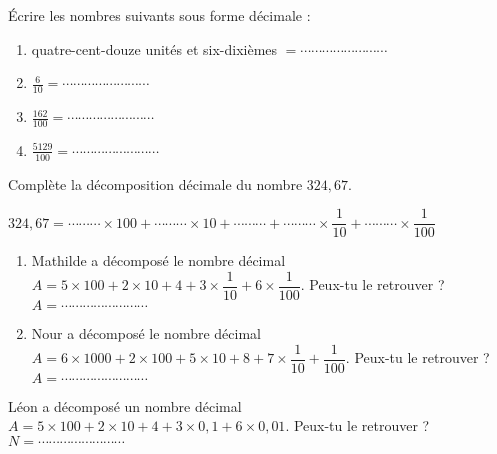 \begin{minipage}{0.5\linewidth}


Écrire les nombres suivants sous forme décimale :
\begin{enumerate}
\item quatre-cent-douze unités et six-dixièmes $= \cdots\cdots\cdots\cdots\cdots\cdots\cdots\cdots $
\item $\frac{6}{10}= \cdots\cdots\cdots\cdots\cdots\cdots\cdots\cdots$
\item $\frac{162}{100}= \cdots\cdots\cdots\cdots\cdots\cdots\cdots\cdots$
\item $\frac{5129}{100}= \cdots\cdots\cdots\cdots\cdots\cdots\cdots\cdots$
\end{enumerate}
 

Complète la décomposition décimale du nombre $324,67$.

$324,67 = \cdots\cdots\cdots  \times 100 + \cdots\cdots\cdots \times 10 + \cdots\cdots\cdots  + \cdots\cdots\cdots \times \dfrac{1}{10} + \cdots\cdots\cdots \times \dfrac{1}{100} $




\begin{enumerate}


\item Mathilde a décomposé le nombre décimal  $A = 5\times 100 + 2\times 10 + 4 + 3\times \dfrac{1}{10} +  6\times \dfrac{1}{100} $. Peux-tu le retrouver ?
$A = \cdots\cdots\cdots\cdots\cdots\cdots\cdots\cdots $

\item Nour a décomposé le nombre décimal  $A = 6\times 1000 + 2\times 100 + 5\times 10 + 8 + 7\times \dfrac{1}{10} +   \dfrac{1}{100} $. Peux-tu le retrouver ?
$A = \cdots\cdots\cdots\cdots\cdots\cdots\cdots\cdots $
\end{enumerate}



Léon a décomposé un nombre décimal  $A = 5\times 100 + 2\times 10 + 4 + 3\times 0,1 +  6\times 0,01 $. Peux-tu le retrouver ?
$N = \cdots\cdots\cdots\cdots\cdots\cdots\cdots\cdots $



\end{minipage}
